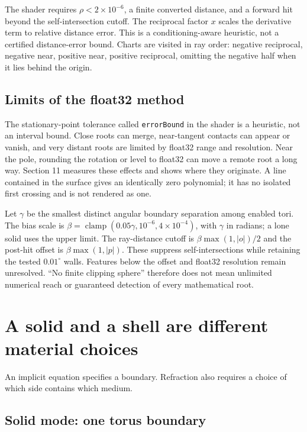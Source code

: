 \documentclass[11pt,a4paper]{article}
\begin{document}
The shader requires \(\rho<2\times10^{-6}\), a finite converted
distance, and a forward hit beyond the self-intersection cutoff. The
reciprocal factor \(x\) scales the derivative term to relative distance
error. This is a conditioning-aware heuristic, not a certified
distance-error bound. Charts are visited in ray order: negative
reciprocal, negative near, positive near, positive reciprocal, omitting
the negative half when it lies behind the origin.

\subsection{Limits of the float32
method}\label{limits-of-the-float32-method}

The stationary-point tolerance called \texttt{errorBound} in the shader
is a heuristic, not an interval bound. Close roots can merge,
near-tangent contacts can appear or vanish, and very distant roots are
limited by float32 range and resolution. Near the pole, rounding the
rotation or level to float32 can move a remote root a long way. Section
11 measures these effects and shows where they originate. A line
contained in the surface gives an identically zero polynomial; it has no
isolated first crossing and is not rendered as one.

Let \(\gamma\) be the smallest distinct angular boundary separation
among enabled tori. The bias scale is
\(\beta=\operatorname{clamp}(0.05\gamma,10^{-6},4\times10^{-4})\), with
\(\gamma\) in radians; a lone solid uses the upper limit. The
ray-distance cutoff is \(\beta\max(1,|o|)/2\) and the post-hit offset is
\(\beta\max(1,|p|)\). These suppress self-intersections while retaining
the tested \(0.01^\circ\) walls. Features below the offset and float32
resolution remain unresolved. ``No finite clipping sphere'' therefore
does not mean unlimited numerical reach or guaranteed detection of every
mathematical root.

\section{A solid and a shell are different material
choices}\label{a-solid-and-a-shell-are-different-material-choices}

An implicit equation specifies a boundary. Refraction also requires a
choice of which side contains which medium.

\subsection{Solid mode: one torus
boundary}\label{solid-mode-one-torus-boundary}
\end{document}
